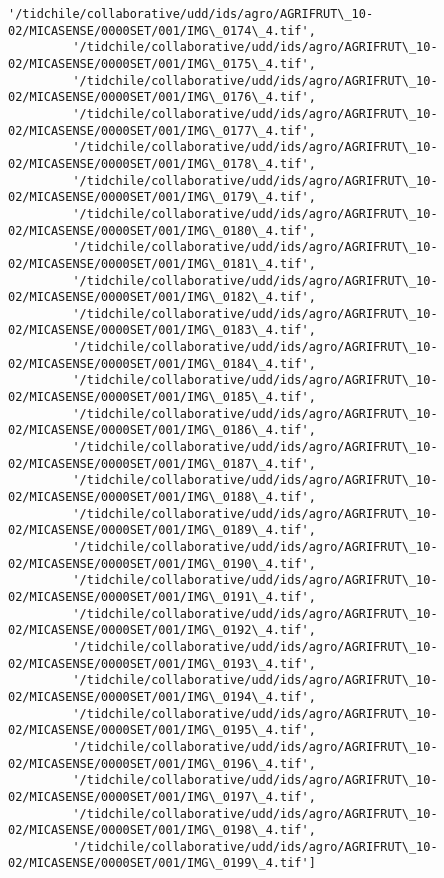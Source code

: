 \documentclass[11pt]{article}
\begin{document}
\begin{Verbatim}[commandchars=\\\{\}]
         '/tidchile/collaborative/udd/ids/agro/AGRIFRUT\_10-02/MICASENSE/0000SET/001/IMG\_0174\_4.tif',
         '/tidchile/collaborative/udd/ids/agro/AGRIFRUT\_10-02/MICASENSE/0000SET/001/IMG\_0175\_4.tif',
         '/tidchile/collaborative/udd/ids/agro/AGRIFRUT\_10-02/MICASENSE/0000SET/001/IMG\_0176\_4.tif',
         '/tidchile/collaborative/udd/ids/agro/AGRIFRUT\_10-02/MICASENSE/0000SET/001/IMG\_0177\_4.tif',
         '/tidchile/collaborative/udd/ids/agro/AGRIFRUT\_10-02/MICASENSE/0000SET/001/IMG\_0178\_4.tif',
         '/tidchile/collaborative/udd/ids/agro/AGRIFRUT\_10-02/MICASENSE/0000SET/001/IMG\_0179\_4.tif',
         '/tidchile/collaborative/udd/ids/agro/AGRIFRUT\_10-02/MICASENSE/0000SET/001/IMG\_0180\_4.tif',
         '/tidchile/collaborative/udd/ids/agro/AGRIFRUT\_10-02/MICASENSE/0000SET/001/IMG\_0181\_4.tif',
         '/tidchile/collaborative/udd/ids/agro/AGRIFRUT\_10-02/MICASENSE/0000SET/001/IMG\_0182\_4.tif',
         '/tidchile/collaborative/udd/ids/agro/AGRIFRUT\_10-02/MICASENSE/0000SET/001/IMG\_0183\_4.tif',
         '/tidchile/collaborative/udd/ids/agro/AGRIFRUT\_10-02/MICASENSE/0000SET/001/IMG\_0184\_4.tif',
         '/tidchile/collaborative/udd/ids/agro/AGRIFRUT\_10-02/MICASENSE/0000SET/001/IMG\_0185\_4.tif',
         '/tidchile/collaborative/udd/ids/agro/AGRIFRUT\_10-02/MICASENSE/0000SET/001/IMG\_0186\_4.tif',
         '/tidchile/collaborative/udd/ids/agro/AGRIFRUT\_10-02/MICASENSE/0000SET/001/IMG\_0187\_4.tif',
         '/tidchile/collaborative/udd/ids/agro/AGRIFRUT\_10-02/MICASENSE/0000SET/001/IMG\_0188\_4.tif',
         '/tidchile/collaborative/udd/ids/agro/AGRIFRUT\_10-02/MICASENSE/0000SET/001/IMG\_0189\_4.tif',
         '/tidchile/collaborative/udd/ids/agro/AGRIFRUT\_10-02/MICASENSE/0000SET/001/IMG\_0190\_4.tif',
         '/tidchile/collaborative/udd/ids/agro/AGRIFRUT\_10-02/MICASENSE/0000SET/001/IMG\_0191\_4.tif',
         '/tidchile/collaborative/udd/ids/agro/AGRIFRUT\_10-02/MICASENSE/0000SET/001/IMG\_0192\_4.tif',
         '/tidchile/collaborative/udd/ids/agro/AGRIFRUT\_10-02/MICASENSE/0000SET/001/IMG\_0193\_4.tif',
         '/tidchile/collaborative/udd/ids/agro/AGRIFRUT\_10-02/MICASENSE/0000SET/001/IMG\_0194\_4.tif',
         '/tidchile/collaborative/udd/ids/agro/AGRIFRUT\_10-02/MICASENSE/0000SET/001/IMG\_0195\_4.tif',
         '/tidchile/collaborative/udd/ids/agro/AGRIFRUT\_10-02/MICASENSE/0000SET/001/IMG\_0196\_4.tif',
         '/tidchile/collaborative/udd/ids/agro/AGRIFRUT\_10-02/MICASENSE/0000SET/001/IMG\_0197\_4.tif',
         '/tidchile/collaborative/udd/ids/agro/AGRIFRUT\_10-02/MICASENSE/0000SET/001/IMG\_0198\_4.tif',
         '/tidchile/collaborative/udd/ids/agro/AGRIFRUT\_10-02/MICASENSE/0000SET/001/IMG\_0199\_4.tif']
\end{Verbatim}
            
\end{document}
